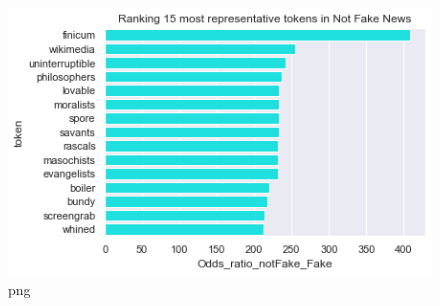 \documentclass[
  11pt,
  a4paper,
]{article}
\begin{document}
\begin{figure}
\centering
\includegraphics{output_96_0.png}
\caption{png}
\end{figure}
\end{document}
